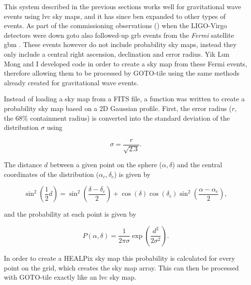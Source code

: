 \begin{colsection}
\begin{colsection}
This system described in the previous sections works well for gravitational wave events using \gls{lvc} sky maps, and it has since ben expanded to other types of events. As part of the commissioning observations () when the LIGO-Virgo detectors were down \gls{goto} also followed-up \gls{grb} events from the \textit{Fermi} satellite \gls{gbm} \citep{Fermi_GBM}. These events however do not include probability sky maps, instead they only include a central right ascension, declination and error radius. Yik Lun Mong and I developed code in order to create a sky map from these Fermi events, therefore allowing them to be processed by GOTO-tile using the same methods already created for gravitational wave events.

Instead of loading a sky map from a FITS file, a function was written to create a probability sky map based on a 2D Gaussian profile. First, the error radius ($r$, the 68\% containment radius) is converted into the standard deviation of the distribution $\sigma$ using

\begin{equation}
    \sigma = \frac{r}{\sqrt{2.3}}.
    \label{eq:gaussian_sigma}
\end{equation}

The distance $d$ between a given point on the sphere ($\alpha, \delta$) and the central coordinates of the distribution ($\alpha_c, \delta_c$) is given by

\begin{equation}
    \sin^2 \left ( \frac{1}{2} d \right )
    = \sin^2 \left ( \frac{\delta-\delta_c}{2} \right)
      + \cos (\delta) \cos (\delta_c) \sin^2 \left ( \frac{\alpha-\alpha_c}{2} \right),
    \label{eq:gaussian_distance}
\end{equation}

and the probability at each point is given by

\begin{equation}
    P(\alpha, \delta) = \frac{1}{2\pi\sigma} \exp \left ( \frac{d^2}{2\sigma^2} \right ).
    \label{eq:gaussian_prob}
\end{equation}

In order to create a HEALPix sky map this probability is calculated for every point on the grid, which creates the sky map array. This can then be processed with GOTO-tile exactly like an \gls{lvc} sky map.


\end{colsection}
\end{colsection}
